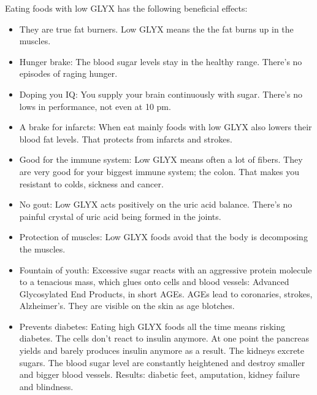 \documentclass[../main.tex]{subfiles}
\begin{document}
Eating foods with low GLYX has the following beneficial effects:

\begin{itemize}
\item They are true fat burners. Low GLYX means the the fat burns up in the muscles.
\item Hunger brake: The blood sugar levels stay in the healthy range. There's no episodes of raging hunger.
\item Doping you IQ: You supply your brain continuously with sugar. There's no lows in performance, not even at 10 pm.
\item  A brake for infarcts: When eat mainly foods with low GLYX also lowers their blood fat levels.
  That protects from infarcts and strokes.
\item Good for the immune system: Low GLYX means often a lot of fibers.
  They are very good for your biggest immune system; the colon.
  That makes you resistant to colds, sickness and cancer.
\item No gout: Low GLYX acts positively on the uric acid balance. There's no painful crystal of uric acid being formed in the joints.
\item Protection of muscles: Low GLYX foods avoid that the body is decomposing the muscles.
\item Fountain of youth: Excessive sugar reacts with an aggressive protein molecule to a tenacious mass,
  which glues onto cells and blood vessels:
  Advanced Glycosylated End Products, in short AGEs.
  AGEs lead to coronaries, strokes, Alzheimer's.
  They are visible on the skin as age blotches.
\item Prevents diabetes: Eating high GLYX foods all the time means risking diabetes. The cells don't react to insulin anymore.
  At one point the pancreas yields and barely produces insulin anymore as a result.
  The kidneys excrete sugars. The blood sugar level are constantly heightened and destroy smaller and bigger blood vessels.
  Results: diabetic feet, amputation,
  kidney failure and blindness. 
\end{itemize}
\end{document}
